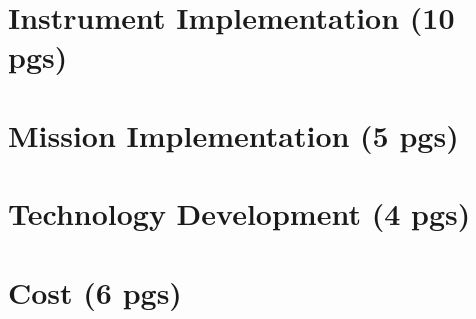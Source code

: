 \documentclass[12pt]{article}
\begin{document}
\section{Instrument Implementation (10 pgs)}


\section{Mission Implementation (5 pgs)}


\section{Technology Development (4 pgs)}


\section{Cost (6 pgs)}


\newpage




\end{document}
